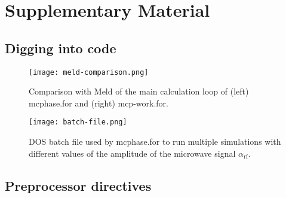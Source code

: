 \section{Supplementary Material}

\begin{supplement}



\subsection{Digging into code}

\begin{figure}[h]
    \centering
    \texttt{[image: meld-comparison.png]}
    \caption{Comparison with Meld of the main calculation loop of (left) \textsf{mcphase.for} and (right) \textsf{mcp-work.for}.}
    \label{fig:meld-comparison}
\end{figure}

\begin{figure}[h]
    \centering
    \texttt{[image: batch-file.png]}
    \caption{DOS batch file used by \textsf{mcphase.for} to run multiple simulations with different values of the amplitude of the microwave signal $\alpha_\mathrm{rf}$.}
    \label{fig:batch-file}
\end{figure}



\clearpage
\subsection{Preprocessor directives}

\begin{figure}[h]
\centering


\end{figure}
\end{supplement}
